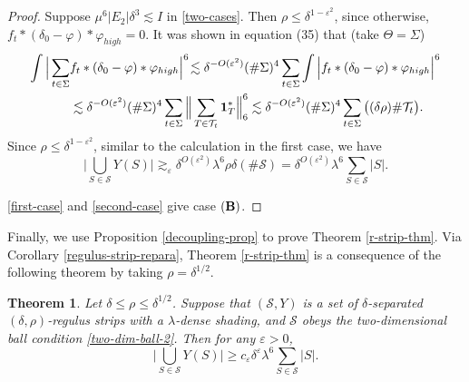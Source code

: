 \documentclass{amsart}%
\numberwithin{equation}{section}
\newtheorem{theorem}{Theorem}[section]
\newcommand{\de}{\delta}
\newcommand{\e}{\varepsilon}
\newcommand{\la}{\lambda}
\newcommand{\Si}{\Sigma}
\newcommand{\vp}{\varphi}
\newcommand{\cs}{\mathcal S}
\newcommand{\Id}{{\bf{1}}}
\newcommand{\cT}{{\mathcal T}}
\newcommand{\1}{\mathbbm{1}}
\begin{document}
\begin{proof}
Suppose $\mu^6|E_2|\de^3\lesssim I$ in \eqref{two-cases}. 
Then $\rho\leq\de^{1-\e^2}$, since otherwise, $f_t\ast(\delta_0-\vp)\ast\vp_{high}=0$. 
It was shown in \cite{GGGHMW} equation (35) that (take $\Theta=\Si$)
\begin{align}
    \int\Big|\sum_{t\in\Si} &f_t\ast(\delta_0-\vp)\ast\vp_{high}\Big|^6 \!\lesssim\de^{-O(\e^2)}(\#\Si)^4\sum_{t\in\Si}\int\Big| f_t\ast(\delta_0-\vp)\ast\vp_{high}\Big|^6\\
    &\lesssim\de^{-O(\e^2)}(\#\Si)^4\sum_{t\in\Si}\Big\|\sum_{T\in\cT_t}\Id_T^\ast\Big\|_6^6\lesssim\de^{-O(\e^2)}(\#\Si)^4\sum_{t\in\Si}\big((\de\rho)\#\cT_t\big).
\end{align}
Since $\rho\leq\de^{1-\e^2}$, similar to the calculation in the first case, we have 
\begin{equation}
\label{second-case}
    \Big|\bigcup_{S\in\cs}Y(S)\Big|\gtrsim_\e \de^{O(\e^2)}\la^{6}\rho\de(\#\cs)=\de^{O(\e^2)}\la^{6}\sum_{S\in\cs}|S|.
\end{equation}

\eqref{first-case} and \eqref{second-case} give case ${\bf (B)}$.\qedhere

\end{proof}

\medskip

Finally, we use Proposition \ref{decoupling-prop} to prove Theorem \ref{r-strip-thm}. 
Via Corollary \ref{regulus-strip-repara}, Theorem \ref{r-strip-thm} is a consequence of the following theorem by taking $\rho=\de^{1/2}$.

\begin{theorem}
\label{main-thm}
Let $\de\leq\rho\leq\de^{1/2}$. Suppose that $(\cs, Y)$ is a set of $\de$-separated $(\de,\rho)$-regulus strips with a $\la$-dense shading, and $\cs$ obeys the two-dimensional ball condition \eqref{two-dim-ball-2}. 
Then for any $\e>0$,
\begin{equation}
\label{main-esti}
    \Big|\bigcup_{S\in\cs}Y(S)\Big|\geq c_\e\de^{\e}\la^6\sum_{S\in\cs}|S|.
\end{equation}

\end{theorem}
\end{document}
